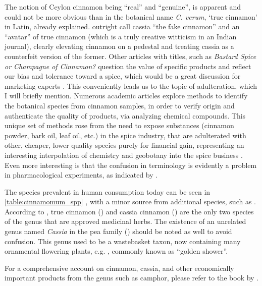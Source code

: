 The notion of Ceylon cinnamon being ``real'' and ``genuine'', is apparent and could not be more obvious than in the botanical name \textit{C. verum}, `true cinnamon' in Latin, already explained. \textcite{dinesh_controversies_2015} outright call cassia ``the fake cinnamon'' and an ``avatar'' of true cinnamon (which is a truly creative witticism in an Indian journal), clearly elevating cinnamon on a pedestal and treating cassia as a counterfeit version of the former. Other articles with titles, such as \textit{Bastard Spice or Champagne of Cinnamon?} question the value of specific products and reflect our bias and tolerance toward a spice, which would be a great discussion for marketing experts \parencite[see][]{derks_bastard_2020}.  
This conveniently leads us to the topic of adulteration, which I will briefly mention. Numerous academic articles explore methods to identify the botanical species from cinnamon samples, in order to verify origin and authenticate the quality of  products, via analyzing chemical compounds. This unique set of methods rose from the need to expose substances (cinnamon powder, bark oil, leaf oil, etc.) in the spice industry, that are adulterated with other, cheaper, lower quality species purely for financial gain, representing an interesting interpolation of chemistry and geobotany into the spice business \parencite[see][]{ford_cinnamon_2019}. Even more interesting is that the confusion in terminology is evidently a problem in pharmacological experiments, as indicated by \textcite{oketch-rabah_cinnamon_2018}.

The species prevalent in human consumption today can be seen in \cref{table:cinnamomum_spp} \parencite{kawatra_cinnamon_2015}, with a minor source from additional species, such as . According to \textcite{ulbricht_evidence-based_2011}, true cinnamon () and cassia cinnamon () are the only two species of the genus that are approved medicinal herbs. The existence of an unrelated genus named \textit{Cassia} in the pea family () should be noted as well to avoid confusion. This genus used to be a wastebasket taxon, now containing many ornamental flowering plants, e.g. , commonly known as ``golden shower''. 

For a comprehensive account on cinnamon, cassia, and other economically important products from the genus  such as camphor, please refer to the book by \textcite{ravindran_cinnamon_2004}.

